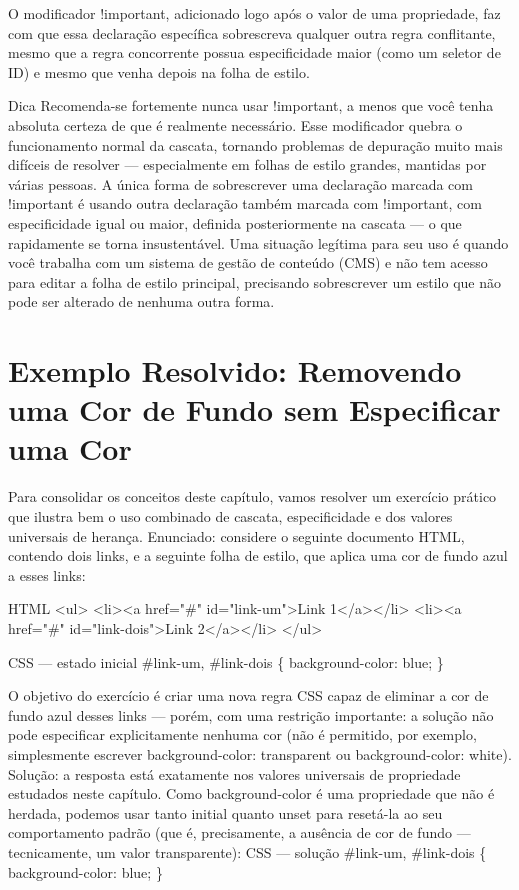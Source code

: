 O modificador !important, adicionado logo após o valor de uma propriedade, faz com que essa declaração específica sobrescreva qualquer outra regra conflitante, mesmo que a regra concorrente possua especificidade maior (como um seletor de ID) e mesmo que venha depois na folha de estilo.

\begin{infobox}{Dica}
Recomenda-se fortemente nunca usar !important, a menos que você tenha absoluta certeza de que é realmente necessário. Esse modificador quebra o funcionamento normal da cascata, tornando problemas de depuração muito mais difíceis de resolver — especialmente em folhas de estilo grandes, mantidas por várias pessoas. A única forma de sobrescrever uma declaração marcada com !important é usando outra declaração também marcada com !important, com especificidade igual ou maior, definida posteriormente na cascata — o que rapidamente se torna insustentável. Uma situação legítima para seu uso é quando você trabalha com um sistema de gestão de conteúdo (CMS) e não tem acesso para editar a folha de estilo principal, precisando sobrescrever um estilo que não pode ser alterado de nenhuma outra forma.
\end{infobox}

\section{Exemplo Resolvido: Removendo uma Cor de Fundo sem Especificar uma Cor}

Para consolidar os conceitos deste capítulo, vamos resolver um exercício prático que ilustra bem o uso combinado de cascata, especificidade e dos valores universais de herança. Enunciado: considere o seguinte documento HTML, contendo dois links, e a seguinte folha de estilo, que aplica uma cor de fundo azul a esses links:

\begin{codebox}{HTML}
<ul>
  <li><a href="#" id="link-um">Link 1</a></li>
  <li><a href="#" id="link-dois">Link 2</a></li>
</ul>
\end{codebox}

CSS — estado inicial \#link-um, \#link-dois \{ background-color: blue; \}

O objetivo do exercício é criar uma nova regra CSS capaz de eliminar a cor de fundo azul desses links — porém, com uma restrição importante: a solução não pode especificar explicitamente nenhuma cor (não é permitido, por exemplo, simplesmente escrever background-color: transparent ou background-color: white). Solução: a resposta está exatamente nos valores universais de propriedade estudados neste capítulo. Como background-color é uma propriedade que não é herdada, podemos usar tanto initial quanto unset para resetá-la ao seu comportamento padrão (que é, precisamente, a ausência de cor de fundo — tecnicamente, um valor transparente): CSS — solução \#link-um, \#link-dois \{ background-color: blue; \}

